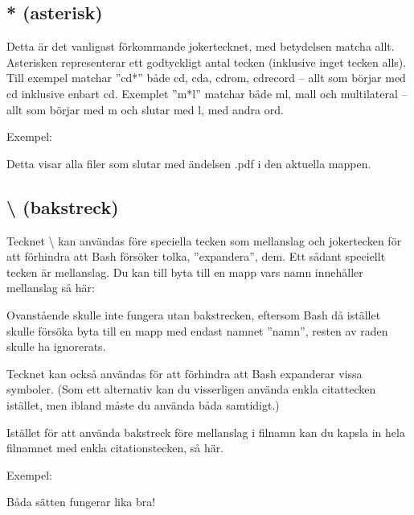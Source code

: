 \documentclass[a4paper,final]{memoir} %
\begin{document}
\subsection{* (asterisk)}


Detta är det vanligast förkommande jokertecknet, med betydelsen matcha allt. Asterisken representerar ett godtyckligt antal tecken (inklusive inget tecken alls). Till exempel matchar ''cd*'' både cd, cda, cdrom, cdrecord -- allt som börjar med cd inklusive enbart cd. Exemplet ''m*l'' matchar både ml, mall och multilateral -- allt som börjar med m och slutar med l, med andra ord.

Exempel:


Detta visar alla filer som slutar med ändelsen .pdf i den aktuella mappen.

\subsection{\textbackslash{} (bakstreck)}\label{sec:backslash}

Tecknet \textbackslash{} kan användas före speciella tecken som mellanslag och jokerteck\-en för att förhindra att Bash försöker tolka, ''expandera'', dem. Ett sådant speciellt tecken är mellanslag. Du kan till byta till en mapp vars namn innehåller mellanslag så här:


Ovanstående skulle inte fungera utan bakstrecken, eftersom Bash då istället skulle försöka byta till  en mapp med endast namnet ''namn'', resten av raden skulle ha ignorerats.

Tecknet kan också användas för att förhindra att Bash expanderar vissa symboler. (Som ett alternativ kan du visserligen använda enkla citattecken istället, men ibland måste du använda båda samtidigt.)

Istället för att använda bakstreck före mellanslag i filnamn kan du kapsla in hela filnamnet med enkla citationstecken, \textquotesingle{}så här\textquotesingle{}.

Exempel:


Båda sätten fungerar lika bra!

\end{document}
